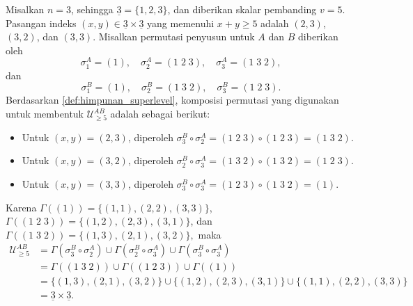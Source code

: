 \begin{contoh}
  Misalkan $n=3$, sehingga $\underline{3}=\{1,2,3\}$, dan diberikan skalar pembanding $v=5$. Pasangan indeks $(x,y)\in\underline{3}\times\underline{3}$ yang memenuhi $x+y\ge 5$ adalah $(2,3)$, $(3,2)$, dan $(3,3)$.
  Misalkan permutasi penyusun untuk $A$ dan $B$ diberikan oleh
  \[
    \sigma_1^A=(1),\quad
    \sigma_2^A=(1\;2\;3),\quad
    \sigma_3^A=(1\;3\;2),
  \]
  dan
  \[
    \sigma_1^B=(1),\quad
    \sigma_2^B=(1\;3\;2),\quad
    \sigma_3^B=(1\;2\;3).
  \]
  Berdasarkan \autoref{def:himpunan_superlevel}, komposisi permutasi yang digunakan untuk membentuk $\mathcal{U}_{\ge 5}^{AB}$ adalah sebagai berikut:
  \begin{itemize}
    \item Untuk $(x,y)=(2,3)$, diperoleh
          $
            \sigma_3^B\circ\sigma_2^A
            =
            (1\;2\;3)\circ(1\;2\;3)
            =
            (1\;3\;2).
          $
    \item Untuk $(x,y)=(3,2)$, diperoleh
          $
            \sigma_2^B\circ\sigma_3^A
            =
            (1\;3\;2)\circ(1\;3\;2)
            =
            (1\;2\;3).
          $
    \item Untuk $(x,y)=(3,3)$, diperoleh
          $
            \sigma_3^B\circ\sigma_3^A
            =
            (1\;2\;3)\circ(1\;3\;2)
            =
            (1).
          $
  \end{itemize}
  Karena
  $
    \Gamma((1))=\{(1,1),(2,2),(3,3)\}
  $,
  $
    \Gamma((1\;2\;3))=\{(1,2),(2,3),(3,1)\}
  $,
  dan
  $
    \Gamma((1\;3\;2))=\{(1,3),(2,1),(3,2)\},
  $
  maka
  \begin{align*}
    \mathcal{U}_{\ge 5}^{AB}
     & =
    \Gamma(\sigma_3^B\circ\sigma_2^A)
    \cup
    \Gamma(\sigma_2^B\circ\sigma_3^A)
    \cup
    \Gamma(\sigma_3^B\circ\sigma_3^A) \\
     & =
    \Gamma((1\;3\;2))
    \cup
    \Gamma((1\;2\;3))
    \cup
    \Gamma((1))                       \\
     & =
    \{(1,3),(2,1),(3,2)\}
    \cup
    \{(1,2),(2,3),(3,1)\}
    \cup
    \{(1,1),(2,2),(3,3)\}             \\
     & =
    \underline{3}\times\underline{3}.
  \end{align*}
\end{contoh}

